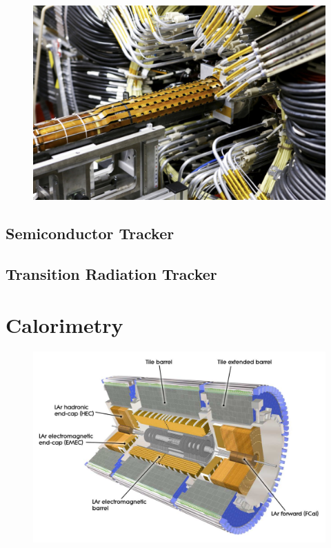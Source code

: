 \begin{figure}[hbtp]
\includegraphics[width=\fullfig]{figures/ibl_insertion.jpg}
\caption{}
\label{fig:ibl_insertion}
\end{figure}


\subsection{Semiconductor Tracker}

\subsection{Transition Radiation Tracker}


\section{Calorimetry}

\begin{figure}[hbtp]
\includegraphics[width=\fullfig]{figures/calo_overview.pdf}
\caption{}
\label{fig:calo_overview}
\end{figure}


